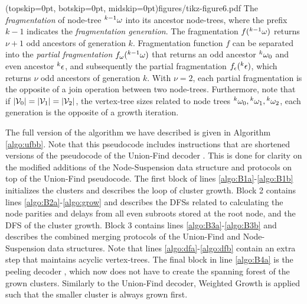 \Figure[hbt](topskip=0pt, botskip=0pt, midskip=0pt){figures/tikz-figure6.pdf}{
  The \emph{fragmentation} of node-tree ${}^{k-1}\omega$ into its ancestor node-trees, where the prefix $k-1$ indicates the \emph{fragmentation generation}. The fragmentation $f({}^{k-1}\omega)$ returns $\nu+1$ odd ancestors of generation $k$. Fragmentation function $f$ can be separated into the \emph{partial fragmentation} $f_\omega({}^{k-1}\omega)$ that returns an odd ancestor ${}^{k}\omega_0$ and even ancestor ${}^{k}\epsilon$, and subsequently the partial fragmentation $f_\epsilon({}^{k}\epsilon)$, which returns $\nu$ odd ancestors of generation $k$. With $\nu=2$, each partial fragmentation is the opposite of a join operation between two node-trees. Furthermore, note that if $\lvert\mathcal{V}_0\rvert = \lvert\mathcal{V}_1\rvert = \lvert\mathcal{V}_2\rvert$, the vertex-tree sizes related to node trees ${}^{k}\omega_0, {}^{k}\omega_1, {}^{k}\omega_2$, each generation is the opposite of a growth iteration. \label{fig6}}

The full version of the algorithm we have described is given in Algorithm \ref{algo:ufbb}. Note that this pseudocode includes instructions that are shortened versions of the pseudocode of the Union-Find decoder \cite{delfosse2017almost}. This is done for clarity on the modified additions of the Node-Suspension data structure and protocols on top of the Union-Find pseudocode. The first block of lines \ref{algo:B1a}-\ref{algo:B1b} initializes the clusters and describes the loop of cluster growth. Block 2 contains lines \ref{algo:B2a}-\ref{algo:grow} and describes the DFSs related to calculating the node parities and delays from all even subroots stored at the root node, and the DFS of the cluster growth. Block 3 contains lines \ref{algo:B3a}-\ref{algo:B3b} and describes the combined merging protocols of the Union-Find and Node-Suspension data structures. Note that lines \ref{algo:dfa}-\ref{algo:dfb} contain an extra step that maintains acyclic vertex-trees. The final block in line \ref{algo:B4a} is the peeling decoder \cite{delfosse2017linear}, which now does not have to create the spanning forest of the grown clusters. Similarly to the Union-Find decoder, Weighted Growth is applied such that the smaller cluster is always grown first. 

